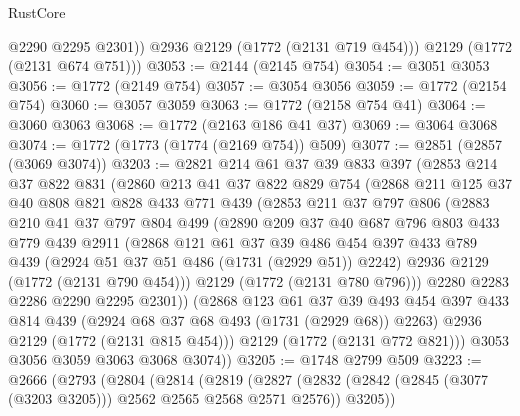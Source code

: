 \begin{lexlean}{RustCore}
\begin{coremodule}
            @2290
            @2295
            @2301))
        @2936
        @2129
        (@1772 (@2131 @719 @454)))
      @2129
      (@1772 (@2131 @674 @751)))
@3053 := @2144 (@2145 @754)
@3054 := @3051 @3053
@3056 := @1772 (@2149 @754)
@3057 := @3054 @3056
@3059 := @1772 (@2154 @754)
@3060 := @3057 @3059
@3063 := @1772 (@2158 @754 @41)
@3064 := @3060 @3063
@3068 := @1772 (@2163 @186 @41 @37)
@3069 := @3064 @3068
@3074 := @1772 (@1773 (@1774 (@2169 @754)) @509)
@3077 := @2851 (@2857 (@3069 @3074))
@3203 := @2821
    @214
    @61
    @37
    @39
    @833
    @397
    (@2853
      @214
      @37
      @822
      @831
      (@2860
        @213
        @41
        @37
        @822
        @829
        @754
        (@2868
          @211
          @125
          @37
          @40
          @808
          @821
          @828
          @433
          @771
          @439
          (@2853
            @211
            @37
            @797
            @806
            (@2883
              @210
              @41
              @37
              @797
              @804
              @499
              (@2890
                @209
                @37
                @40
                @687
                @796
                @803
                @433
                @779
                @439
                @2911
                (@2868
                  @121
                  @61
                  @37
                  @39
                  @486
                  @454
                  @397
                  @433
                  @789
                  @439
                  (@2924 @51 @37 @51 @486 (@1731 (@2929 @51)) @2242)
                  @2936
                  @2129
                  (@1772 (@2131 @790 @454)))
                @2129
                (@1772 (@2131 @780 @796)))
              @2280
              @2283
              @2286
              @2290
              @2295
              @2301))
          (@2868
            @123
            @61
            @37
            @39
            @493
            @454
            @397
            @433
            @814
            @439
            (@2924 @68 @37 @68 @493 (@1731 (@2929 @68)) @2263)
            @2936
            @2129
            (@1772 (@2131 @815 @454)))
          @2129
          (@1772 (@2131 @772 @821)))
        @3053
        @3056
        @3059
        @3063
        @3068
        @3074))
@3205 := @1748 @2799 @509
@3223 := @2666
    (@2793
      (@2804
        (@2814
          (@2819
            (@2827
              (@2832 (@2842 (@2845 (@3077 (@3203 @3205))) @2562 @2565 @2568 @2571 @2576))
              @3205))

\end{coremodule}
\end{lexlean}
